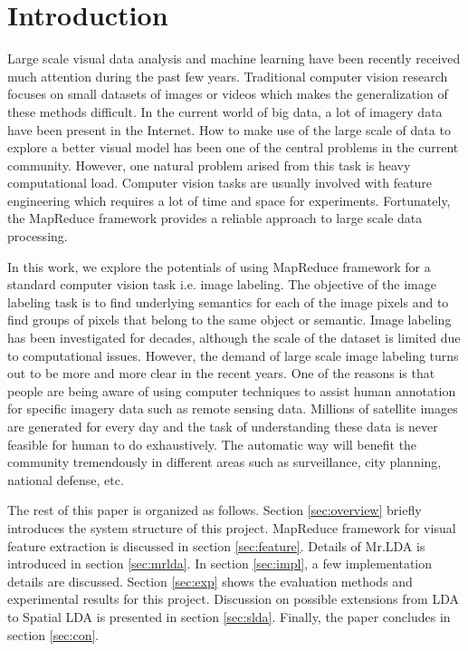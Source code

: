 \documentclass{sig-alternate}
\begin{document}


\section{Introduction}
Large scale visual data analysis and machine learning have been recently received much attention during the past few years. Traditional computer vision research focuses on small datasets of images or videos which makes the generalization of these methods difficult. In the current world of big data, a lot of imagery data have been present in the Internet. How to make use of the large scale of data to explore a better visual model has been one of the central problems in the current community. However, one natural problem arised from this task is heavy computational load. Computer vision tasks are usually involved with feature engineering which requires a lot of time and space for experiments. Fortunately, the MapReduce framework provides a reliable approach to large scale data processing.

In this work, we explore the potentials of using MapReduce framework for a standard computer vision task i.e. image labeling. The objective of the image labeling task is to find underlying semantics for each of the image pixels and to find groups of pixels that belong to the same object or semantic. Image labeling has been investigated for decades, although the scale of the dataset is limited due to computational issues. However, the demand of large scale image labeling turns out to be more and more clear in the recent years. One of the reasons is that people are being aware of using computer techniques to assist human annotation for specific imagery data such as remote sensing data. Millions of satellite images are generated for every day and the task of understanding these data is never feasible for human to do exhaustively. The automatic way will benefit the community tremendously in different areas such as surveillance, city planning, national defense, etc.

The rest of this paper is organized as follows.
Section \ref{sec:overview} briefly introduces the system structure of this project.
MapReduce framework for visual feature extraction is discussed in section \ref{sec:feature}.
Details of Mr.LDA is introduced in section \ref{sec:mrlda}. In section \ref{sec:impl}, a few implementation details are
discussed. Section \ref{sec:exp} shows the evaluation methods and experimental results for this project. Discussion on
possible extensions from LDA to Spatial LDA is presented in section \ref{sec:slda}. Finally, the paper concludes in section \ref{sec:con}.
\end{document}
